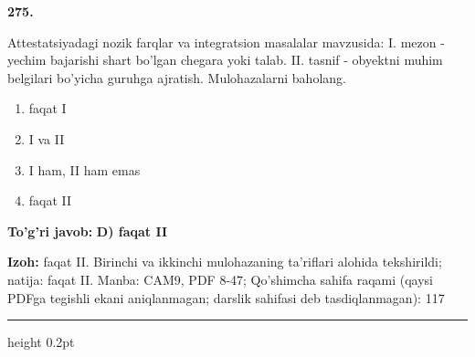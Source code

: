 \documentclass[10pt,a4paper]{article}
\begin{document}
{\bfseries\sffamily\color{ink} 275.}
\par
Attestatsiyadagi nozik farqlar va integratsion masalalar mavzusida: I. mezon - yechim bajarishi shart bo'lgan chegara yoki talab. II. tasnif - obyektni muhim belgilari bo'yicha guruhga ajratish. Mulohazalarni baholang.
\begin{enumerate}[label=\Alph*),leftmargin=9mm]
\item faqat I
\item I va II
\item I ham, II ham emas
\item faqat II
\end{enumerate}
\begin{tcolorbox}[enhanced,breakable,colback=teal!4,colframe=teal!60!black,boxrule=0.45pt,arc=1.2mm,left=2.7mm,right=2.7mm,top=1.8mm,bottom=1.8mm,before skip=2mm,after skip=2mm]
{\bfseries\sffamily\color{teal}To'g'ri javob:} \textbf{D) faqat II}
\par\smallskip
{\bfseries Izoh:} faqat II. Birinchi va ikkinchi mulohazaning ta'riflari alohida tekshirildi; natija: faqat II. Manba: CAM9, PDF 8-47; Qo'shimcha sahifa raqami (qaysi PDFga tegishli ekani aniqlanmagan; darslik sahifasi deb tasdiqlanmagan): 117
\end{tcolorbox}
\vspace{2mm}\hrule height 0.2pt\vspace{3mm}
\end{document}
